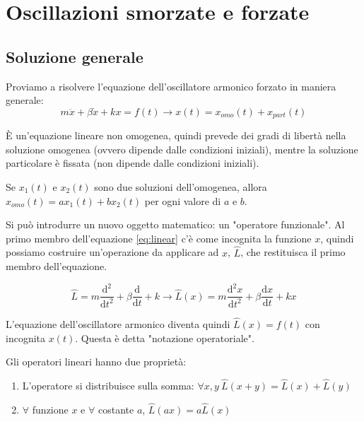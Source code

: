 \chapter{Oscillazioni smorzate e forzate}

\section{Soluzione generale}

Proviamo a risolvere l'equazione dell'oscillatore armonico forzato in maniera generale:
\begin{equation}
	\label{eq:linear}
	m \ddot{x} + \beta \dot{x} + kx = f(t) \to x(t) = x_{omo}(t) + x_{part}(t) 
\end{equation}

È un'equazione lineare non omogenea, quindi prevede dei gradi di libertà nella soluzione omogenea (ovvero dipende dalle condizioni iniziali), mentre la soluzione particolare è fissata (non dipende dalle condizioni iniziali).

\begin{lemma}
	Se \(x_{1}(t)\) e \(x_{2}(t)\) sono due soluzioni dell'omogenea, allora \(x_{omo}(t) = a x_{1}(t) + b x_{2}(t)\) per ogni valore di \(a\) e \(b\).   
\end{lemma}

Si può introdurre un nuovo oggetto matematico: un "operatore funzionale". Al primo membro dell'equazione \eqref{eq:linear} c'è come incognita la funzione \(x\), quindi possiamo costruire un'operazione da applicare ad \(x\), \(\hat{L} \), che restituisca il primo membro dell'equazione.

\[
	\hat{L} = m \frac{\mathrm{d}^2}{\mathrm{d}t^2} + \beta \frac{\mathrm{d}}{\mathrm{d}t} + k \to \hat{L} (x) = m \frac{\mathrm{d}^2 x}{\mathrm{d}t^2} + \beta \frac{\mathrm{d}x}{\mathrm{d}t} + kx
\]

L'equazione dell'oscillatore armonico diventa quindi \(\hat{L} (x) = f(t)\) con incognita \(x(t)\). Questa è detta "notazione operatoriale".

\begin{definition}
	Gli operatori lineari hanno due proprietà:
	\begin{enumerate}
		
		\item L'operatore si distribuisce sulla somma: \(\forall x,y\ \hat{L} (x+y) = \hat{L} (x) + \hat{L} (y)\)
		\item \(\forall \) funzione \(x\) e \(\forall \) costante \(a\), \(\hat{L} (ax) = a \hat{L} (x)\)    
	\end{enumerate}
\end{definition}

